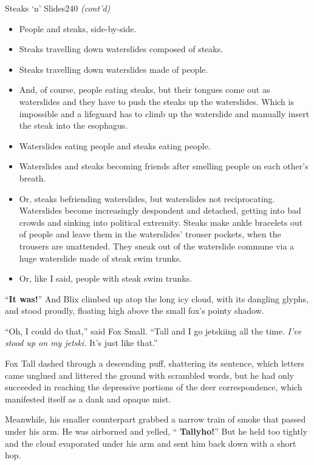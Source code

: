 \documentclass[12pt,twoside]{report}
\begin{document}
	\begin{sidebar}{Steaks `n' Slides}{240}
		\textit{(cont'd)}
		\begin{itemize}
			\item People and steaks, side-by-side.
			\item Steaks travelling down waterslides composed of steaks.
			\item Steaks travelling down waterslides made of people.
			\item And, of course, people eating steaks, but their tongues come out as waterslides and they have to push the steaks up the waterslides. Which is impossible and a lifeguard has to climb up the waterslide and manually insert the steak into the esophagus.
			\item Waterslides eating people and steaks eating people.
			\item Waterslides and steaks becoming friends after smelling people on each other's breath.
			\item Or, steaks befriending waterslides, but waterslides not reciprocating. Waterslides become increasingly despondent and detached, getting into bad crowds and sinking into political extremity. Steaks make ankle bracelets out of people and leave them in the waterslides' trouser pockets, when the trousers are unattended. They sneak out of the waterslide commune via a huge waterslide made of steak swim trunks.
			\item Or, like I said, people with steak swim trunks.
		\end{itemize}
	\end{sidebar}


``{\bf It was!}''  And Blix climbed up atop the long icy cloud, with
its dangling glyphs, and stood proudly, floating high above the small
fox's pointy shadow.

``Oh, I could do that,'' said Fox Small.  ``Tall and I go jetskiing
all the time.  {\em I've stood up on my jetski.}  It's just like
that.''

Fox Tall dashed through a descending puff, shattering its sentence,
which letters came unglued and littered the ground with scrambled
words, but he had only succeeded in reaching the depressive portions
of the deer correspondence, which manifested itself as a dank and
opaque mist.

Meanwhile, his smaller counterpart grabbed a narrow train of smoke
that passed under his arm.  He was airborned and yelled, ``{\bf
  Tallyho!}''  But he held too tightly and the cloud evaporated under
his arm and sent him back down with a short hop.
\end{document}
